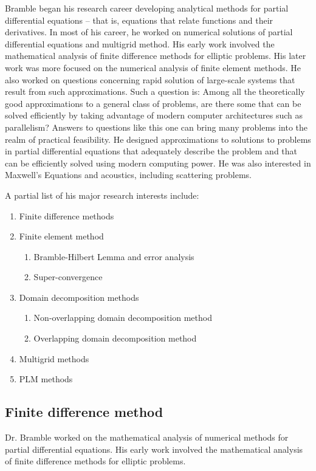 \documentclass[CJK,11pt]{amsart}
\theoremstyle{definition}
\begin{document}
\begin{CJK*}{UTF8}{gbsn}
Bramble began his research career developing analytical methods for partial differential equations – that is, equations that relate functions and their derivatives.  In most of his career, 
he worked on numerical solutions of partial differential equations and multigrid method. His early work involved the mathematical analysis of finite difference methods for elliptic problems. His later work was more focused on the numerical analysis of finite element methods.  He also worked on questions concerning rapid solution of large-scale systems that result from such approximations. Such a question is: Among all the theoretically good approximations to a general class of problems, are there some that can be solved efficiently by taking advantage of modern computer architectures such as parallelism? Answers to questions like this one can bring many problems into the realm of practical feasibility. He designed approximations to solutions to problems in partial differential equations that adequately describe the problem and that can be efficiently solved using modern computing power. He was also interested in Maxwell's Equations and acoustics, including scattering problems.

A partial list of his major research interests include:
\begin{enumerate}
\item Finite difference methods
\item Finite element method
\begin{enumerate}
\item Bramble-Hilbert Lemma and error analysis
\item Super-convergence
\end{enumerate}
\item Domain decomposition methods 
\begin{enumerate}
\item Non-overlapping domain decomposition method
\item Overlapping domain decomposition method
  \end{enumerate}
\item Multigrid methods
\item PLM methods 
\end{enumerate}
\subsection{Finite difference method}
Dr. Bramble worked on the mathematical analysis of numerical methods for partial differential equations. His early work involved the mathematical analysis of finite difference methods for elliptic problems. 


\end{CJK*}
\end{document}
